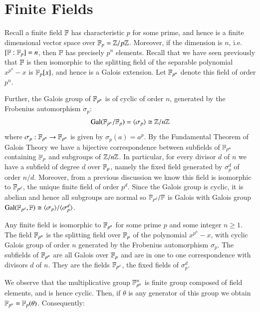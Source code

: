 \documentclass[12pt, a4paper, oneside, openright, titlepage]{book}
\begin{document}
\section{\textsection Finite Fields}

Recall a finite field $\mathbb F$ has characteristic $p$ for some prime, and hence is a finite dimensional vector space over $\mathbb F_p = \mathbb Z/p\mathbb Z$. Moreover, if the dimension is $n$, i.e. $[\mathbb F:\mathbb F_p] = n$, then $\mathbb F$ has precisely $p^n$ elements. Recall that we have seen previously that $\mathbb F$ is then isomorphic to the splitting field of the separable polynomial $x^{p^n}-x$ is $\mathbb F_p[x]$, and hence is a Galois extension. Let $\mathbb F_{p^n}$ denote this field of order $p^n$. 

Further, the Galois group of $\mathbb F_{p^n}$ is of cyclic of order $n$, generated by the Frobenius automorphism $\sigma_p$: \begin{equation*}
    \text{Gal}(\mathbb F_{p^n}/\mathbb F_p) = \langle \sigma_p\rangle \cong \mathbb Z/n\mathbb Z
\end{equation*}
where $\sigma_p:\mathbb F_{p^n}\rightarrow \mathbb F_{p^n}$ is given by $\sigma_p(a) = a^p$. By the Fundamental Theorem of Galois Theory we have a bijective correspondence between subfields of $\mathbb F_{p^n}$ containing $\mathbb F_p$ and subgroups of $\mathbb Z/n\mathbb Z$. In particular, for every divisor $d$ of $n$ we have a subfield of degree $d$ over $\mathbb F_p$, namely the fixed field generated by $\sigma_p^d$ of order $n/d$. Moreover, from a previous discussion we know this field is isomorphic to $\mathbb F_{p^d}$, the unique finite field of order $p^d$. Since the Galois group is cyclic, it is abelian and hence all subgroups are normal so $\mathbb F_{p^d}/\mathbb F$ is Galois with Galois group $\text{Gal}(\mathbb F_{p^d},\mathbb F)\cong \langle \sigma_p\rangle/\langle \sigma_p^d\rangle$. 

\begin{prop}
    Any finite field is isomorphic to $\mathbb F_{p^n}$ for some prime $p$ and some integer $n \geq 1$. The field $\mathbb F_{p^n}$ is the splitting field over $\mathbb F_p$ of the polynomial $x^{p^n}-x$, with cyclic Galois group of order $n$ generated by the Frobenius automorphism $\sigma_p$. The subfields of $\mathbb F_{p^n}$ are all Galois over $\mathbb F_p$ and are in one to one correspondence with divisors $d$ of $n$. They are the fields $\mathbb F_{p^d}$, the fixed fields of $\sigma_p^d$.
\end{prop}

We observe that the multiplicative group $\mathbb F_{p^n}^{\times}$ is finite group composed of field elements, and is hence cyclic. Then, if $\theta$ is any generator of this group we obtain $\mathbb F_{p^n} = \mathbb F_p(\theta)$. Consequently:
\end{document}
